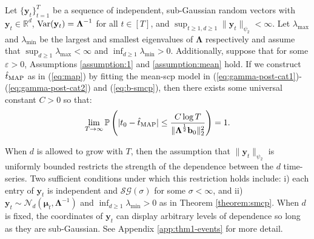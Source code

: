 \begin{theorem}\label{theorem:smcp}
    Let $\{\mathbf{y}_t\}_{t=1}^T$ be a sequence of independent, sub-Gaussian random vectors with $\mathbf{y}_t \in \mathbb{R}^d$, $\normalfont{\Var}(\mathbf{y}_t) = \boldsymbol{\Lambda}^{-1}$ for all $t \in [T]$, and $\sup_{t \geq 1, d \geq 1} \lVert \mathbf{y}_t\rVert_{\psi_2} < \infty$. Let $\lambda_{\max}$ and $\lambda_{\min}$ be the largest and smallest eigenvalues of $\boldsymbol{\Lambda}$ respectively and assume that $\sup_{d\geq 1}  \lambda_{\max} < \infty$ and $\inf_{d\geq 1} \lambda_{\min} > 0$. Additionally, suppose that for some $\varepsilon >0$, Assumptions \ref{assumption:1} and \ref{assumption:mean} hold. If we construct $\hat{t}_{\normalfont \text{MAP}}$ as in (\ref{eq:map}) by fitting the mean-scp model in (\ref{eq:gamma-post-cat1})-(\ref{eq:gamma-post-cat2}) and (\ref{eq:b-smcp}), then there exists some universal constant $C > 0$ so that:
    \vspace{-5pt}
    \begin{align}
        \lim_{T\to\infty}\Pr\left(|t_0 - \hat{t}_{\normalfont \text{MAP}}| \leq \frac{C \log T}{\lVert\boldsymbol{\Lambda}^{\frac{1}{2}}\mathbf{b}_0\rVert_2^2}\right) = 1. \label{eq:thm-1}
    \end{align}
\end{theorem}
\vspace{-5pt}

\begin{remark}\label{rmk:sub-g}
    When $d$ is allowed to grow with $T$, then the assumption that $\lVert \mathbf{y}_t\rVert_{\psi_2}$ is uniformly bounded restricts the strength of the dependence between the $d$ time-series. Two sufficient conditions under which this restriction holds include: i) each entry of $\mathbf{y}_t$ is independent and $\mathcal{SG}(\sigma)$ for some $\sigma < \infty$, and ii) $\mathbf{y}_t \sim \mathcal{N}_d(\boldsymbol{\mu}_t, \boldsymbol{\Lambda}^{-1})$ and $\inf_{d\geq 1}  \lambda_{\min} > 0$ as in Theorem \ref{theorem:smcp}. When $d$ is fixed, the coordinates of $\mathbf{y}_t$ can display arbitrary levels of dependence so long as they are sub-Gaussian. See Appendix \ref{app:thm1-events} for more detail.
\end{remark}
\vspace{-5pt}

